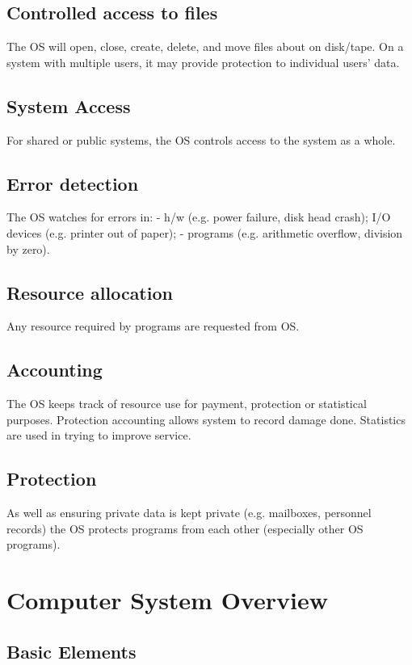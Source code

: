 \documentclass[10pt,a4paper,openany]{book}
\begin{document}
    \subsection*{Controlled access to files}
    The OS will open, close, create, delete, and move files about on disk/tape. On a system with multiple users, it may provide protection to individual users’ data.

    \subsection*{System Access}
    For shared or public systems, the OS controls access to the system as a whole.

    \subsection*{Error detection}
    The OS watches for errors in: - h/w (e.g. power failure, disk head crash); I/O devices (e.g. printer out of paper); - programs (e.g. arithmetic overflow, division by zero).

    \subsection*{Resource allocation}
    Any resource required by programs are requested from OS.

    \subsection*{Accounting}
    The OS keeps track of resource use for payment, protection or statistical purposes. Protection accounting allows system to record damage done. Statistics are used in trying to improve service.

    \subsection*{Protection}
    As well as ensuring private data is kept private (e.g. mailboxes, personnel records) the OS protects programs from each other (especially other OS programs).

    \section{Computer System Overview}
    \subsection{Basic Elements}
\end{document}
